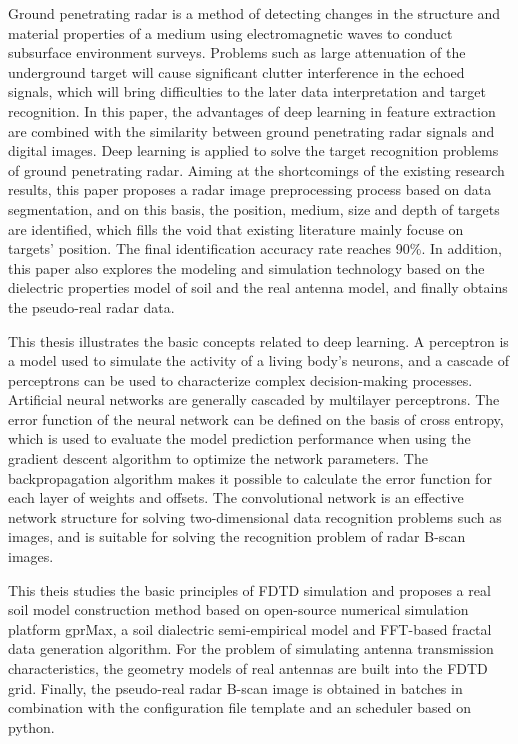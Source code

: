 
\begin{englishabstract}
	Ground penetrating radar is a method of detecting changes in the structure and material properties of a medium using electromagnetic waves to conduct subsurface environment surveys. Problems such as large attenuation of the underground target will cause significant clutter interference in the echoed signals, which will bring difficulties to the later data interpretation and target recognition. In this paper, the advantages of deep learning in feature extraction are combined with the similarity between ground penetrating radar signals and digital images. Deep learning is applied to solve the target recognition problems of ground penetrating radar. Aiming at the shortcomings of the existing research results, this paper proposes a radar image preprocessing process based on data segmentation, and on this basis, the position, medium, size and depth of targets are identified, which fills the void that existing literature mainly focuse on targets' position. The final identification accuracy rate reaches 90\%. In addition, this paper also explores the modeling and simulation technology based on the dielectric properties model of soil and the real antenna model, and finally obtains the pseudo-real radar data.
	
	This thesis illustrates the basic concepts related to deep learning. A perceptron is a model used to simulate the activity of a living body's neurons, and a cascade of perceptrons can be used to characterize complex decision-making processes. Artificial neural networks are generally cascaded by multilayer perceptrons. The error function of the neural network can be defined on the basis of cross entropy, which is used to evaluate the model prediction performance when using the gradient descent algorithm to optimize the network parameters. The backpropagation algorithm makes it possible to calculate the error function for each layer of weights and offsets. The convolutional network is an effective network structure for solving two-dimensional data recognition problems such as images, and is suitable for solving the recognition problem of radar B-scan images. 
	
	This theis studies the basic principles of FDTD simulation and proposes a real soil model construction method based on open-source numerical simulation platform gprMax, a soil dialectric semi-empirical model and FFT-based fractal data generation algorithm. For the problem of simulating antenna transmission characteristics, the geometry models of real antennas are built into the FDTD grid. Finally, the pseudo-real radar B-scan image is obtained in batches in combination with the configuration file template and an scheduler based on python. 
	

\end{englishabstract}
